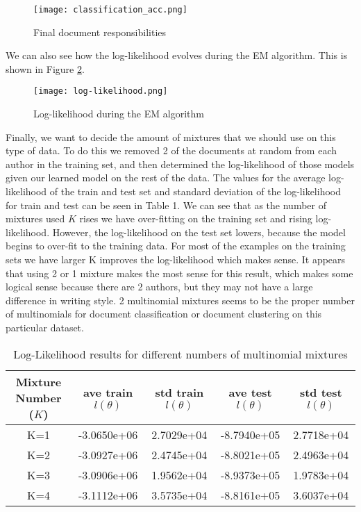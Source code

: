 \documentclass[paper=a4, fontsize=11pt]{scrartcl} %
\begin{document}
\begin{figure}[H]
\centering
\texttt{[image: classification\_acc.png]}
\caption{Final document responsibilities}
\label{fig:classificationacc}
\end{figure}

We can also see how the log-likelihood evolves during the EM algorithm.
This is shown in Figure \ref{fig:ll}.

\begin{figure}
\centering
\texttt{[image: log-likelihood.png]}
\caption{Log-likelihood during the EM algorithm}
\label{fig:ll}
\end{figure}

Finally, we want to decide the amount of mixtures that we should use on this type of data.
To do this we removed 2 of the documents at random from each author in the training set, and then determined the log-likelihood of those models given our learned model on the rest of the data.
The values for the average log-likelihood of the train and test set and standard deviation of the log-likelihood for train and test can be seen in Table 1.
We can see that as the number of mixtures used $K$ rises we have over-fitting on the training set and rising log-likelihood.
However, the log-likelihood on the test set lowers, because the model begins to over-fit to the training data. 
For most of the examples on the training sets we have larger K improves the log-likelihood which makes sense.
It appears that using 2 or 1 mixture makes the most sense for this result, which makes some logical sense because there are 2 authors, but they may not have a large difference in writing style.
2 multinomial mixtures seems to be the proper number of multinomials for document classification or document clustering on this particular dataset.

\begin{table}
\centering
\label{tab:mm}
\caption{Log-Likelihood results for different numbers of multinomial mixtures}
\begin{tabular}{|c|c|c|c|c|}
\hline
Mixture Number ($K$) & ave train $l(\theta)$ & std train $l(\theta)$  & ave test $l(\theta)$  &  std test $l(\theta)$  \\ \hline \hline
K=1 & -3.0650e+06 & 2.7029e+04 &  -8.7940e+05 & 2.7718e+04 \\ \hline
K=2 &  -3.0927e+06 & 2.4745e+04 & -8.8021e+05 &  2.4963e+04 \\ \hline
K=3 & -3.0906e+06 & 1.9562e+04 & -8.9373e+05 & 1.9783e+04 \\ \hline
K=4 & -3.1112e+06 & 3.5735e+04 & -8.8161e+05 & 3.6037e+04 \\ \hline
\end{tabular}
\end{table}
\end{document}
